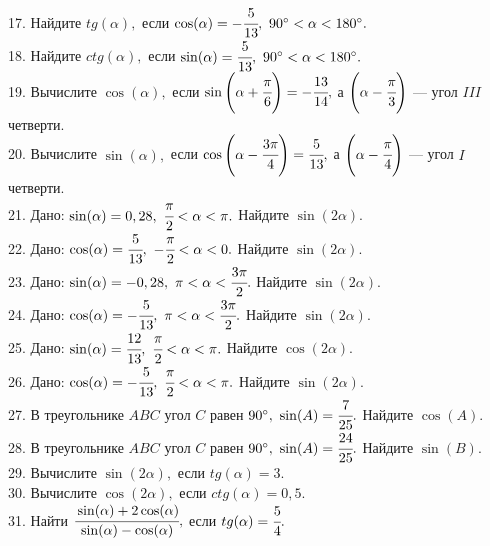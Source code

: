 \documentclass[12pt]{article}
\begin{document}
17. Найдите $tg(\alpha),$ если $\cos(\alpha)=-\cfrac{5}{13},\ 90^\circ<\alpha<180^\circ.$\\
18. Найдите $ctg(\alpha),$ если $\sin(\alpha)=\cfrac{5}{13},\ 90^\circ<\alpha<180^\circ.$\\
19. Вычислите $\cos(\alpha),$ если $\sin\left(\alpha+\cfrac{\pi}{6}\right)=-\cfrac{13}{14},$ а $\left(\alpha-\cfrac{\pi}{3}\right)$ --- угол $III$ четверти.\\
20. Вычислите $\sin(\alpha),$ если $\cos\left(\alpha-\cfrac{3\pi}{4}\right)=\cfrac{5}{13},$ а $\left(\alpha-\cfrac{\pi}{4}\right)$ --- угол $I$ четверти.\\
21. Дано: $\sin(\alpha)=0,28,\ \cfrac{\pi}{2}<\alpha<\pi.$ Найдите $\sin(2\alpha).$\\
22. Дано: $\cos(\alpha)=\cfrac{5}{13},\ -\cfrac{\pi}{2}<\alpha<0.$ Найдите $\sin(2\alpha).$\\
23. Дано: $\sin(\alpha)=-0,28,\ \pi<\alpha<\cfrac{3\pi}{2}.$ Найдите $\sin(2\alpha).$\\
24. Дано: $\cos(\alpha)=-\cfrac{5}{13},\ \pi<\alpha<\cfrac{3\pi}{2}.$ Найдите $\sin(2\alpha).$\\
25. Дано: $\sin(\alpha)=\cfrac{12}{13},\ \cfrac{\pi}{2}<\alpha<\pi.$ Найдите $\cos(2\alpha).$\\
26. Дано: $\cos(\alpha)=-\cfrac{5}{13},\ \cfrac{\pi}{2}<\alpha<\pi.$ Найдите $\sin(2\alpha).$\\
27. В треугольнике $ABC$ угол $C$ равен $90^\circ,\ \sin(A)=\cfrac{7}{25}.$ Найдите $\cos(A).$\\
28. В треугольнике $ABC$ угол $C$ равен $90^\circ,\ \sin(A)=\cfrac{24}{25}.$ Найдите $\sin(B).$\\
29. Вычислите $\sin(2\alpha),$ если $tg(\alpha)=3.$\\
30. Вычислите $\cos(2\alpha),$ если $ctg(\alpha)=0,5.$\\
31. Найти $\cfrac{\sin(\alpha)+2\cos(\alpha)}{\sin(\alpha)-\cos(\alpha)},$ если $tg(\alpha)=\cfrac{5}{4}.$
\newpage
\end{document}
